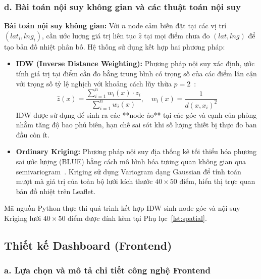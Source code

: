\subsubsection*{d. Bài toán nội suy không gian và các thuật toán nội suy}

\textbf{Bài toán nội suy không gian:} Với $n$ node cảm biến đặt tại các vị trí $(lat_i, lng_i)$, cần ước lượng giá trị liên tục $\hat{z}$ tại mọi điểm chưa đo $(lat, lng)$ để tạo bản đồ nhiệt phân bố. Hệ thống sử dụng kết hợp hai phương pháp:
\begin{itemize}[leftmargin=2cm]
  \item \textbf{IDW (Inverse Distance Weighting):} Phương pháp nội suy xác định, ước tính giá trị tại điểm cần đo bằng trung bình có trọng số của các điểm lân cận với trọng số tỷ lệ nghịch với khoảng cách lũy thừa $p=2$~\cite{shepard1968idw}:
    \begin{equation}
      \hat{z}(x) = \frac{\sum_{i=1}^{n} w_i(x) \cdot z_i}{\sum_{i=1}^{n} w_i(x)}, \quad w_i(x) = \frac{1}{d(x, x_i)^2}
    \end{equation}
    IDW được sử dụng để sinh ra các **node ảo** tại các góc và cạnh của phòng nhằm tăng độ bao phủ biên, hạn chế sai sót khi số lượng thiết bị thực đo ban đầu còn ít.
  \item \textbf{Ordinary Kriging:} Phương pháp nội suy địa thống kê tối thiểu hóa phương sai ước lượng (BLUE) bằng cách mô hình hóa tương quan không gian qua semivariogram~\cite{cressie1990kriging}. Kriging sử dụng Variogram dạng Gaussian để tính toán mượt mà giá trị của toàn bộ lưới kích thước $40 \times 50$ điểm, hiển thị trực quan bản đồ nhiệt trên Leaflet.
\end{itemize}
Mã nguồn Python thực thi quá trình kết hợp IDW sinh node góc và nội suy Kriging lưới $40 \times 50$ điểm được đính kèm tại Phụ lục~\ref{lst:spatial}.

\subsection{Thiết kế Dashboard (Frontend)}
\label{subsec:design:frontend}

\subsubsection*{a. Lựa chọn và mô tả chi tiết công nghệ Frontend}

